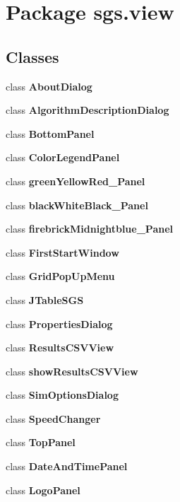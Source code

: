 \section{Package sgs.\-view}
\label{namespacesgs_1_1view}
\subsection*{Classes}
\begin{DoxyCompactItemize}
\item 
class {\bf About\-Dialog}
\item 
class {\bf Algorithm\-Description\-Dialog}
\item 
class {\bf Bottom\-Panel}
\item 
class {\bf Color\-Legend\-Panel}
\item 
class {\bfseries green\-Yellow\-Red\-\_\-\-Panel}
\item 
class {\bfseries black\-White\-Black\-\_\-\-Panel}
\item 
class {\bfseries firebrick\-Midnightblue\-\_\-\-Panel}
\item 
class {\bf First\-Start\-Window}
\item 
class {\bf Grid\-Pop\-Up\-Menu}
\item 
class {\bf J\-Table\-S\-G\-S}
\item 
class {\bf Properties\-Dialog}
\item 
class {\bf Results\-C\-S\-V\-View}
\item 
class {\bf show\-Results\-C\-S\-V\-View}
\item 
class {\bf Sim\-Options\-Dialog}
\item 
class {\bf Speed\-Changer}
\item 
class {\bf Top\-Panel}
\item 
class {\bfseries Date\-And\-Time\-Panel}
\item 
class {\bfseries Logo\-Panel}
\end{DoxyCompactItemize}

